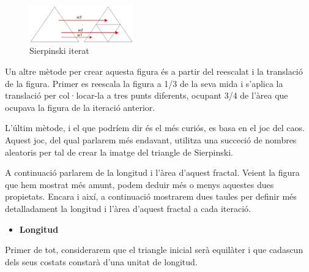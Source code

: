 \documentclass[12pt]{report}
\begin{document}
\begin{figure}

    \includegraphics [width=0.4\textwidth] {sierpinski2.PNG}
    \caption{Sierpinski iterat}
\end{figure}
Un altre mètode per crear aquesta figura és a partir del reescalat i la translació de la figura. Primer es reescala la figura a 1/3 de la seva mida i s'aplica la translació per col·locar-la a tres punts diferents, ocupant 3/4 de l'àrea que ocupava la figura de la iteració anterior.

L'últim mètode, i el que podríem dir és el més curiós, es basa en el joc del caos. Aquest joc, del qual parlarem més endavant, utilitza una succeció de nombres aleatoris per tal de crear la imatge del triangle de Sierpinski.

A continuació parlarem de la longitud i l'àrea d'aquest fractal. Veient la figura que hem mostrat més amunt, podem deduir més o menys aquestes dues propietats. Encara i així, a continuació mostrarem dues taules per definir més detalladament la longitud i l'àrea d'aquest fractal a cada iteració.
\newline
\begin{itemize}
\item \textbf{Longitud}
\end{itemize}
Primer de tot, considerarem que el triangle inicial serà equilàter i que cadascun dels seus costats constarà d'una unitat de longitud.
\end{document}
